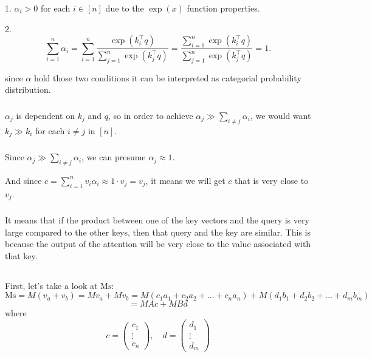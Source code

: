 \documentclass{article}
\begin{document}
1. \(\alpha_i > 0\) for each \(i \in [n]\) due to the \(\exp(x)\) function properties.

2. \[
\sum_{i=1}^n \alpha_i = \sum_{i=1}^n \frac{\exp(k_i^\top q)}{\sum_{j=1}^n \exp(k_j^\top q)} = 
\frac{\sum_{i=1}^n \exp(k_i^\top q)}{\sum_{j=1}^n \exp(k_j^\top q)} = 1.
\]

since \(\alpha\) hold those two conditions it can be interpreted as categorial probability distribution.

\subsubsection{}
\(\alpha_j\) is dependent on \(k_j\) and \(q\), so in order to achieve \(\alpha_j \gg \sum_{i \neq j} \alpha_i\), we would want \(k_j \gg k_i\) for each \(i \neq j\) in \([n]\).
\subsubsection{}
Since \(\alpha_j \gg \sum_{i \neq j} \alpha_i\), we can presume \(\alpha_j \approx 1\). 

And since \(c = \sum_{i=1}^n v_i \alpha_i \approx 1 \cdot v_j = v_j\), it means we will get \(c\) that is very close to \(v_j\).
\subsubsection{}
It means that if the product between one of the key vectors and the query is very large compared to the other keys, then that query and the key are similar. This is because the output of the attention will be very close to the value associated with that key.
\subsection{}
\subsubsection{}
First, let's take a look at \( \text{Ms} \):
\[
\text{Ms} = M(v_a + v_b) = Mv_a + Mv_b = M(c_1a_1 + c_2a_2 + \dots + c_n a_n) + M(d_1b_1 + d_2b_2 + \dots + d_m b_m)
\]
\[
= MAc + MBd
\]
where 
\[
c = \begin{pmatrix} c_1 \\ \vdots \\ c_n \end{pmatrix}, \quad d = \begin{pmatrix} d_1 \\ \vdots \\ d_m \end{pmatrix}
\]
\end{document}
